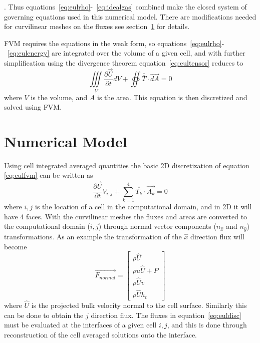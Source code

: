 \documentclass[]{aiaa-tc}%
\newcommand{\pderiv}[2]{\frac{\partial #1}{\partial #2}}
\newcommand*{\rttensor}[1]{\overline{\overline{#1}}}
\begin{document}
. Thus equations~\ref{eq:eulrho}-~\ref{eq:idealgas} combined make the closed system of governing equations used in this numerical model. There are modifications needed for curvilinear meshes on the fluxes see section~\ref{sec:nummod} for details.

FVM requires the equations in the weak form, so equations~\ref{eq:eulrho}-~\ref{eq:eulenergy} are integrated over the volume of a given cell, and with further simplification using the divergence theorem equation~\ref{eq:eultensor} reduces to
\begin{equation}\label{eq:eulfvm}
  \iiint\limits_V \pderiv{\vec{U}}{t} dV + \oiint \rttensor{T} \cdot \vec{dA} = 0
\end{equation}
where $V$ is the volume, and $A$ is the area. This equation is then discretized and solved using FVM. 

\section{Numerical Model}\label{sec:nummod}
Using cell integrated averaged quantities the basic 2D discretization of equation \ref{eq:eulfvm} can be written as
\begin{equation} \label{eq:euldisc}
  \pderiv{\vec{U}}{t}V_{i,j} + \sum_{k=1}^4\rttensor{T_k}\cdot \vec{A_k} = 0
\end{equation}
where ${i,j}$ is the location of a cell in the computational domain, and in 2D it will have 4 faces.  With the curvilinear meshes the fluxes and areas are converted to the computational domain ($i,j$) through normal vector components ($n_{\hat{x}}$ and $n_{\hat{y}}$) transformations. As an example the transformation of the $\hat{x}$ direction flux will become
\[
  \vec{F_{normal}} =
  \begin{bmatrix}
    \rho \hat{U} \\
    \rho u\hat{U} + P \\
    \rho \hat{U} v \\
    \rho \hat{U} h_t
  \end{bmatrix}
\]
where $\hat{U}$ is the projected bulk velocity normal to the cell surface. Similarly this can be done to obtain the $j$ direction flux. The fluxes in equation~\ref{eq:euldisc} must be evaluated at the interfaces of a given cell ${i,j}$, and this is done through reconstruction of the cell averaged solutions onto the interface. 
\end{document}

